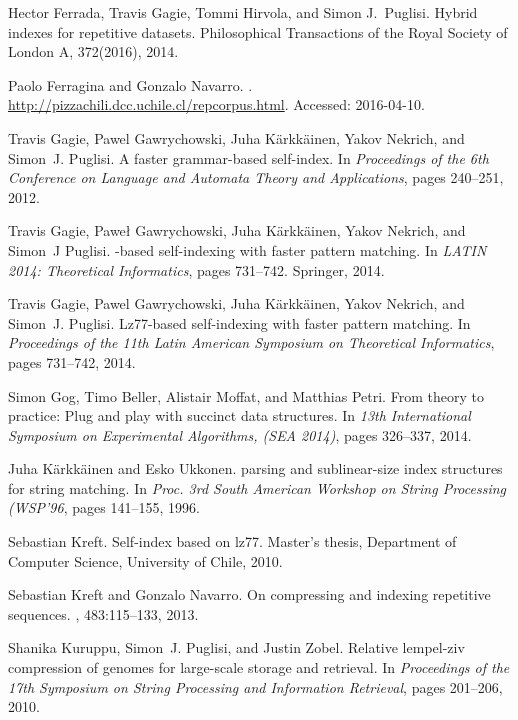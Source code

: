 \documentclass[a4paper,UKenglish]{lipics-v2016}
\begin{document}
\begin{thebibliography}{10}
Hector Ferrada, Travis Gagie, Tommi Hirvola, and Simon J.~Puglisi.
\newblock Hybrid indexes for repetitive datasets.
\newblock Philosophical Transactions of the Royal Society of London A, 372(2016), 2014.

Paolo Ferragina and Gonzalo Navarro.
.
\newblock \url{http://pizzachili.dcc.uchile.cl/repcorpus.html}.
\newblock Accessed: 2016-04-10.

Travis Gagie, Pawel Gawrychowski, Juha K{\"{a}}rkk{\"{a}}inen, Yakov Nekrich,
  and Simon~J. Puglisi.
\newblock A faster grammar-based self-index.
\newblock In {\em Proceedings of the 6th Conference on Language and Automata
  Theory and Applications}, pages 240--251, 2012.

Travis Gagie, Pawe{\l} Gawrychowski, Juha K{\"a}rkk{\"a}inen, Yakov Nekrich,
  and Simon~J Puglisi.
-based self-indexing with faster pattern matching.
\newblock In {\em {LATIN} 2014: Theoretical Informatics}, pages 731--742.
  Springer, 2014.

Travis Gagie, Pawel Gawrychowski, Juha K{\"{a}}rkk{\"{a}}inen, Yakov Nekrich,
  and Simon~J. Puglisi.
\newblock Lz77-based self-indexing with faster pattern matching.
\newblock In {\em Proceedings of the 11th Latin American Symposium on
  Theoretical Informatics}, pages 731--742, 2014.

Simon Gog, Timo Beller, Alistair Moffat, and Matthias Petri.
\newblock From theory to practice: Plug and play with succinct data structures.
\newblock In {\em 13th International Symposium on Experimental Algorithms, (SEA
  2014)}, pages 326--337, 2014.

Juha K{\"a}rkk{\"a}inen and Esko Ukkonen.
 parsing and sublinear-size index structures for string
  matching.
\newblock In {\em Proc. 3rd South American Workshop on String Processing
  (WSP'96}, pages 141--155, 1996.

Sebastian Kreft.
\newblock Self-index based on lz77.
\newblock Master's thesis, Department of Computer Science, University of Chile,
  2010.

Sebastian Kreft and Gonzalo Navarro.
\newblock On compressing and indexing repetitive sequences.
, 483:115--133, 2013.

Shanika Kuruppu, Simon~J. Puglisi, and Justin Zobel.
\newblock Relative lempel-ziv compression of genomes for large-scale storage
  and retrieval.
\newblock In {\em Proceedings of the 17th Symposium on String Processing and
  Information Retrieval}, pages 201--206, 2010.


\end{thebibliography}
\end{document}
